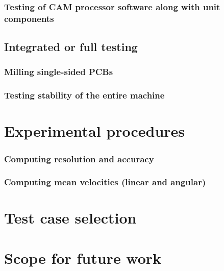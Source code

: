 \subsubsection*{Testing of CAM processor software along with unit components}

\subsection{Integrated or full testing}

\subsubsection*{ Milling single-sided PCBs}
\subsubsection*{Testing stability of the entire machine}


\section{Experimental procedures}

\subsubsection*{Computing resolution and accuracy}
\subsubsection*{Computing mean velocities (linear and angular)}

\section{Test case selection}

\section{Scope for future work}